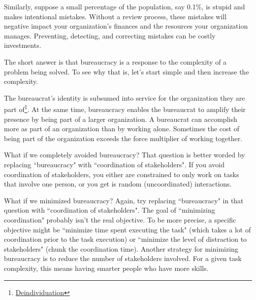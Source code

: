 Similarly, suppose a small percentage of the population, say 0.1\%, is stupid and makes intentional mistakes. Without a review process, these mistakes will negative impact your organization's finances and the resources your organization manages. Preventing, detecting, and correcting mistakes can be costly investments. 


The short answer is that bureaucracy is a response to the complexity of a problem being solved. To see why that is, let's start simple and then increase the complexity. 



The bureaucrat's identity is subsumed into service for the organization they are part of\footnote{\href{https://en.wikipedia.org/wiki/Deindividuation}{Deindividuation}}. At the same time, bureaucracy enables the bureaucrat to amplify their presence by being part of a larger organization. A bureaucrat can accomplish more as part of an organization than by working alone. Sometimes the cost of being part of the organization exceeds the force multiplier of working together. 


What if we completely avoided bureaucracy? That question is better worded by replacing ``bureaucracy" with ``coordination of stakeholders". If you avoid coordination of stakeholders, you either are constrained to only work on tasks that involve one person, or you get is random (uncoordinated) interactions. 

What if we minimized bureaucracy? Again, try replacing ``bureaucracy" in that question with ``coordination of stakeholders". The goal of ``minimizing coordination" probably isn't the real objective. To be more precise, a specific objective might be ``minimize time spent executing the task" (which takes a lot of coordination prior to the task execution) or ``minimize the level of distraction to stakeholders" (chunk the coordination time). Another strategy for minimizing bureaucracy is to reduce the number of stakeholders involved. For a given task complexity, this means having smarter people who have more skills. 

